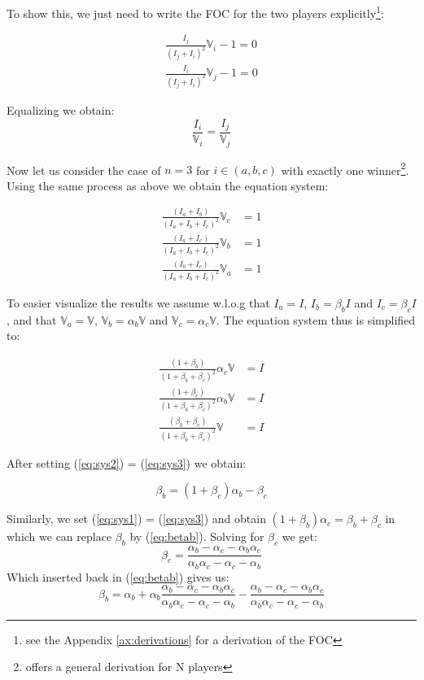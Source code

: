 To show this, we just need to write the FOC for the two players explicitly\footnote{see the Appendix \ref{ax:derivations} for a derivation of the FOC}:

\begin{equation*}
\begin{split}
    \frac{I_j}{(I_j + I_i)^2}\mathbb{V}_i-1 = 0 \\
    \frac{I_i}{(I_j + I_i)^2}\mathbb{V}_j-1 = 0
\end{split}
\end{equation*}

Equalizing we obtain:
\begin{equation}
    \frac{I_i}{\mathbb{V}_i} = \frac{I_j}{\mathbb{V}_j} 
\end{equation}

Now let us consider the case of $n=3$ for $i \in (a,b,c)$ with exactly one winner\footnote{\cite{stein2002} offers a general derivation for N players}. Using the same process as above we obtain the equation system:

\begin{align}
    \frac{(I_a+I_b)}{(I_a+I_b+I_c)^2}\mathbb{V}_c&=1\\
    \frac{(I_a+I_c)}{(I_a+I_b+I_c)^2}\mathbb{V}_b&=1\\
    \frac{(I_b+I_c)}{(I_a+I_b+I_c)^2}\mathbb{V}_a&=1
\end{align}

To easier visualize the results we assume w.l.o.g that $I_a = I$, $I_b = \beta_b I$ and $ I_c = \beta_c I $, and that $\mathbb{V}_a = \mathbb{V}$, $\mathbb{V}_b = \alpha_b \mathbb{V} $ and $\mathbb{V}_c = \alpha_c \mathbb{V}$. The equation system thus is simplified to:

\begin{align}
    \label{eq:sys1}\frac{(1+\beta_b)}{(1+\beta_b+ \beta_c )^2}\alpha_c\mathbb{V}&=I\\
    \label{eq:sys2}\frac{(1+\beta_c )}{(1+\beta_b  + \beta_c )^2}\alpha_b\mathbb{V}&=I\\
    \label{eq:sys3}\frac{(\beta_b +\beta_c )}{(1+\beta_b  + \beta_c )^2}\mathbb{V}&=I
\end{align}

After setting (\ref{eq:sys2}) = (\ref{eq:sys3}) we obtain:

\begin{equation}
    \label{eq:betab}\beta_b=(1+\beta_c)\alpha_b-\beta_c
\end{equation}

Similarly, we set (\ref{eq:sys1}) = (\ref{eq:sys3}) and obtain $(1+\beta_b)\alpha_c=\beta_b+\beta_c$ in which we can replace $\beta_b$ by (\ref{eq:betab}). Solving for $\beta_c$ we get:
\begin{equation}
\label{eq:betac}
    \beta_c = \frac{\alpha_b-\alpha_c-\alpha_b\alpha_c}{\alpha_b\alpha_c-\alpha_c-\alpha_b}
\end{equation}
Which inserted back in (\ref{eq:betab}) gives us:
\begin{equation}
\label{eq:betab2}
    \beta_b=\alpha_b + \alpha_b\frac{\alpha_b-\alpha_c-\alpha_b\alpha_c}{\alpha_b\alpha_c-\alpha_c-\alpha_b}-\frac{\alpha_b-\alpha_c-\alpha_b\alpha_c}{\alpha_b\alpha_c-\alpha_c-\alpha_b}
\end{equation}

